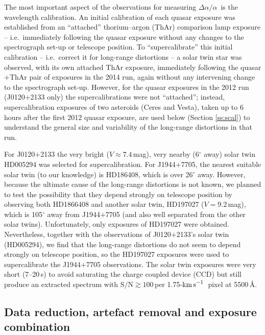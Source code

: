 \documentclass[fleqn,usenatbib,usedcolumn]{mnras}
\renewcommand{\la}{\lesssim} %
\renewcommand{\ga}{\gtrsim} %
\newcommand{\Sref}[1]{Section \ref{#1}}
\newcommand{\kms}{\ensuremath{\textrm{km\,s}^{-1}}}
\newcommand{\SN}{\ensuremath{\textrm{S/N}}}
\newcommand{\daa}{\ensuremath{\Delta\alpha/\alpha}}
\begin{document}


The most important aspect of the observations for measuring \daa\ is the wavelength calibration. An initial calibration of each quasar exposure was established from an ``attached'' thorium--argon (ThAr) comparison lamp exposure -- i.e.\ immediately following the quasar exposure without any changes to the spectrograph set-up or telescope position. To ``supercalibrate'' this initial calibration -- i.e.\ correct it for long-range distortions -- a solar twin star was observed, with its own attached ThAr exposure, immediately following the quasar$+$ThAr pair of exposures in the 2014 run, again without any intervening change to the spectrograph set-up. However, for the quasar exposures in the 2012 run (J0120$+$2133 only) the supercalibrations were not ``attached''; instead, supercalibration exposures of two asteroids (Ceres and Vesta), taken up to 6 hours after the first 2012 quasar exposure, are used below (\Sref{ss:scal}) to understand the general size and variability of the long-range distortions in that run.

For J0120$+$2133 the very bright ($V\approx7.4$\,mag), very nearby (6$^\circ$ away) solar twin HD005294 was selected for supercalibration. For J1944$+$7705, the nearest suitable solar twin (to our knowledge) is HD186408, which is over 26$^\circ$ away. However, because the ultimate cause of the long-range distortions is not known, we planned to test the possibility that they depend strongly on telescope position by observing both HD1866408 and another solar twin, HD197027 ($V=9.2$\,mag), which is 105$^\circ$ away from J1944$+$7705 (and also well separated from the other solar twins). Unfortunately, only exposures of HD197027 were obtained. Nevertheless, together with the observations of J0120$+$2133's solar twin (HD005294), we find that the long-range distortions do not seem to depend strongly on telescope position, so the HD197027 exposures were used to supercalibrate the J1944$+$7705 observations. The solar twin exposures were very short (7--20\,s) to avoid saturating the charge coupled device (CCD) but still produce an extracted spectrum with $\SN\ga100$\,per 1.75-\kms\ pixel at 5500\,\AA.


\subsection{Data reduction, artefact removal and exposure combination}\label{ss:red}
\end{document}

